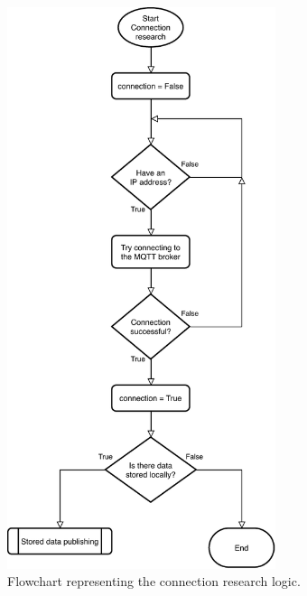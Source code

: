 \begin{figure}[h]
\centering 
\includegraphics[width=0.7\textwidth]{images/flowconnection} 
\caption{Flowchart representing the connection research logic.}
\label{fig:flowconnection}
\end{figure}

